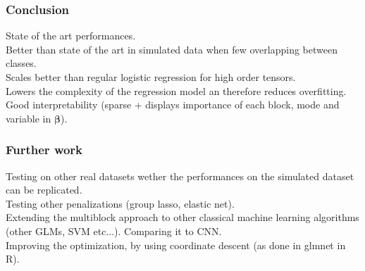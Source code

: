 \documentclass{beamer}
\begin{document}
\begin{frame}
    \frametitle{Conclusion}
    State of the art performances.\\[15 pt]
    Better than state of the art in simulated data when few overlapping between classes.\\[15 pt]
    Scales better than regular logistic regression for high order tensors.\\[15 pt]
    Lowers the complexity of the regression model an therefore reduces overfitting.\\[15 pt]
    Good interpretability (sparse + displays importance of each block, mode and variable in $\bm{\beta}$).

\end{frame}




\begin{frame}
    \frametitle{Further work}
    Testing on other real datasets wether the performances on the simulated dataset can be replicated.\\[10 pt]
    Testing other penalizations (group lasso, elastic net).\\[10 pt]
    Extending the multiblock approach to other classical machine learning algorithms (other GLMs, SVM etc...). Comparing it to CNN.\\[10 pt]
    Improving the optimization, by using coordinate descent (as done in glmnet \cite{glmnet} in R).
\end{frame}
\end{document}
